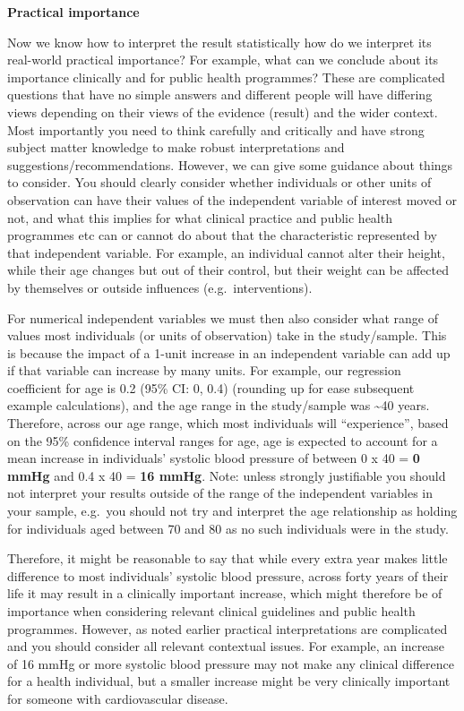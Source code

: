 \documentclass[
]{book}
\begin{document}
\textbf{Practical importance}

Now we know how to interpret the result statistically how do we interpret its real-world practical importance? For example, what can we conclude about its importance clinically and for public health programmes? These are complicated questions that have no simple answers and different people will have differing views depending on their views of the evidence (result) and the wider context. Most importantly you need to think carefully and critically and have strong subject matter knowledge to make robust interpretations and suggestions/recommendations. However, we can give some guidance about things to consider. You should clearly consider whether individuals or other units of observation can have their values of the independent variable of interest moved or not, and what this implies for what clinical practice and public health programmes etc can or cannot do about that the characteristic represented by that independent variable. For example, an individual cannot alter their height, while their age changes but out of their control, but their weight can be affected by themselves or outside influences (e.g.~interventions).

For numerical independent variables we must then also consider what range of values most individuals (or units of observation) take in the study/sample. This is because the impact of a 1-unit increase in an independent variable can add up if that variable can increase by many units. For example, our regression coefficient for age is 0.2 (95\% CI: 0, 0.4) (rounding up for ease subsequent example calculations), and the age range in the study/sample was \textasciitilde40 years. Therefore, across our age range, which most individuals will ``experience'', based on the 95\% confidence interval ranges for age, age is expected to account for a mean increase in individuals' systolic blood pressure of between 0 x 40 = \textbf{0 mmHg} and 0.4 x 40 = \textbf{16 mmHg}. Note: unless strongly justifiable you should not interpret your results outside of the range of the independent variables in your sample, e.g.~you should not try and interpret the age relationship as holding for individuals aged between 70 and 80 as no such individuals were in the study.

Therefore, it might be reasonable to say that while every extra year makes little difference to most individuals' systolic blood pressure, across forty years of their life it may result in a clinically important increase, which might therefore be of importance when considering relevant clinical guidelines and public health programmes. However, as noted earlier practical interpretations are complicated and you should consider all relevant contextual issues. For example, an increase of 16 mmHg or more systolic blood pressure may not make any clinical difference for a health individual, but a smaller increase might be very clinically important for someone with cardiovascular disease.
\end{document}
